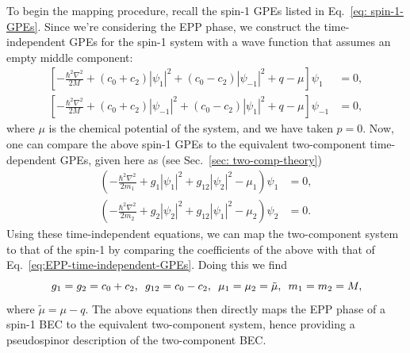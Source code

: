 To begin the mapping procedure, recall the spin-1 GPEs listed in
Eq.~\eqref{eq: spin-1-GPEs}.
Since we're considering the EPP phase, we construct the time-independent
GPEs for the spin-1 system with a wave function that assumes an empty middle
component:
\begin{equation}
    \begin{aligned}
        \left[-\frac{\hbar^2\nabla^2}{2M}
            + (c_0 + c_2)|\psi_1|^2 + (c_0 - c_2)|\psi_{-1}|^2
        + q - \mu\right]\psi_1    & = 0, \\
        \left[-\frac{\hbar^2\nabla^2}{2M}
            + (c_0 + c_2)|\psi_{-1}|^2 + (c_0 - c_2)|\psi_1|^2
        + q - \mu\right]\psi_{-1} & = 0,
    \end{aligned}
    \label{eq:EPP-time-independent-GPEs}
\end{equation}
where \( \mu \) is the chemical potential of the system, and we have taken
\( p=0 \).
Now, one can compare the above spin-1 GPEs to the equivalent two-component
time-dependent GPEs, given here as (see Sec.~\ref{sec: two-comp-theory})
\begin{equation}
    \begin{aligned}
        \left(-\frac{\hbar^2\nabla^2}{2m_1} + g_1|\psi_1|^2
        +g_{12}|\psi_2|^2 - \mu_1\right)\psi_1 & = 0, \\
        \left(-\frac{\hbar^2\nabla^2}{2m_2} + g_2|\psi_2|^2
        +g_{12}|\psi_1|^2 - \mu_2\right)\psi_2 & = 0.
    \end{aligned}
    \label{eq:two-comp-time-independent-gpes}
\end{equation}
Using these time-independent equations, we can map the two-component system
to that of the spin-1 by comparing the coefficients of the above with that of
Eq.~\eqref{eq:EPP-time-independent-GPEs}.
Doing this we find
\begin{equation}
    g_1=g_2=c_0+c_2, \enskip g_{12} = c_0-c_2, \enskip \mu_1=\mu_2=\tilde{\mu},
    \enskip m_1=m_2=M,
\end{equation}
where \( \tilde{\mu} = \mu - q \).
The above equations then directly maps the EPP phase of a spin-1 BEC to the
equivalent two-component system, hence providing a pseudospinor description
of the two-component BEC\@.

